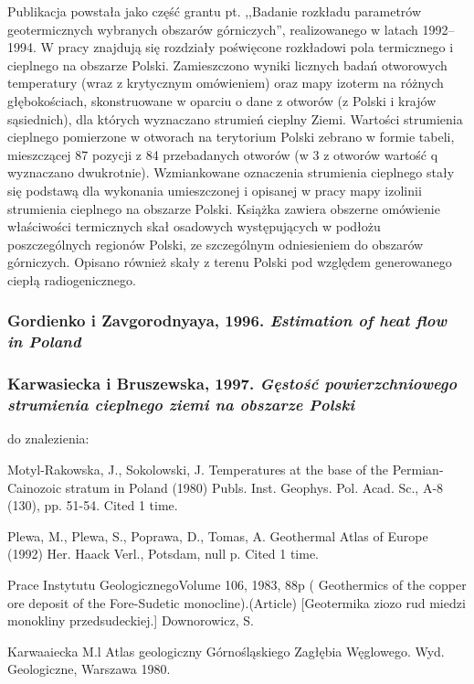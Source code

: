 \documentclass[11.5pt,twoside]{report}
\begin{document}
Publikacja powstała jako część grantu pt. ,,Badanie rozkładu parametrów geotermicznych wybranych obszarów górniczych'', realizowanego w latach 1992--1994. W pracy znajdują się rozdziały poświęcone rozkładowi pola termicznego i cieplnego na obszarze Polski. Zamieszczono wyniki licznych badań otworowych temperatury (wraz z krytycznym omówieniem) oraz mapy izoterm na różnych głębokościach, skonstruowane w oparciu o dane z otworów (z Polski i krajów sąsiednich), dla których wyznaczano strumień cieplny Ziemi. Wartości strumienia cieplnego pomierzone w otworach na terytorium Polski zebrano w formie tabeli, mieszczącej 87 pozycji z 84 przebadanych otworów (w 3 z otworów wartość q wyznaczano dwukrotnie). Wzmiankowane oznaczenia strumienia cieplnego stały się podstawą dla wykonania umieszczonej i opisanej w pracy mapy izolinii strumienia cieplnego na obszarze Polski. Książka zawiera obszerne omówienie właściwości termicznych skał osadowych występujących w podłożu poszczególnych regionów Polski, ze szczególnym odniesieniem do obszarów górniczych. Opisano również skały z terenu Polski pod względem generowanego ciepłą radiogenicznego.

\subsubsection{Gordienko i Zavgorodnyaya, 1996. \textit{Estimation of heat flow in Poland}}

\subsubsection{Karwasiecka i Bruszewska, 1997. \textit{Gęstość powierzchniowego strumienia cieplnego ziemi na obszarze Polski}}

\iffalse
do znalezienia: 

Motyl-Rakowska, J., Sokolowski, J.
Temperatures at the base of the Permian-Cainozoic stratum in Poland
(1980) Publs. Inst. Geophys. Pol. Acad. Sc., A-8 (130), pp. 51-54. Cited 1 time.


Plewa, M., Plewa, S., Poprawa, D., Tomas, A.
Geothermal Atlas of Europe
(1992) Her. Haack Verl., Potsdam, null p. Cited 1 time.

 Prace Instytutu GeologicznegoVolume 106, 1983, 88p
( Geothermics of the copper ore deposit of the Fore-Sudetic monocline).(Article)
[Geotermika ziozo rud miedzi monokliny przedsudeckiej.]
Downorowicz, S. 

 Karwaaiecka M.l  Atlas geologiczny Górnośląskiego  Zagłębia Węglowego. 
Wyd.  Geologiczne,  Warszawa  1980.
\end{document}
